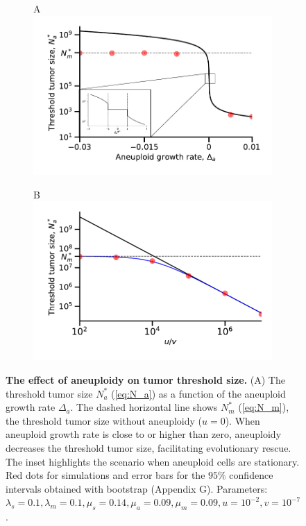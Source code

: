 \documentclass[12pt]{extarticle}
\begin{document}
\begin{figure}
\begin{subfigure}{0.5\textwidth}
A\\
\includegraphics[width=1\textwidth]{Figures/ThresholdPopulationSizePlot.pdf}
\end{subfigure}
\begin{subfigure}{0.5\textwidth}
B\\
\includegraphics[width=1\textwidth]{Figures/ThresholdPopulationSizeVersusRatioPlot.pdf}
\end{subfigure}
\caption{
\textbf{The effect of aneuploidy on tumor threshold size.}
(A) The threshold tumor size $N_a^*$ (\cref{eq:N_a}) as a function of the aneuploid growth rate $\Delta_a$. The dashed horizontal line shows $N^*_m$ (\cref{eq:N_m}), the threshold tumor size without aneuploidy ($u=0$).  When aneuploid growth rate is close to or higher than zero, aneuploidy decreases the threshold tumor size, facilitating evolutionary rescue. The inset highlights the scenario when aneuploid cells are stationary. Red dots for simulations and error bars for the $95\%$ confidence intervals obtained with bootstrap (Appendix G). Parameters: $\lambda_s=0.1,\lambda_m=0.1,\mu_s=0.14,\mu_a=0.09,\mu_m=0.09, u=10^{-2}, v=10^{-7}$. %
}
\end{figure}
\end{document}
